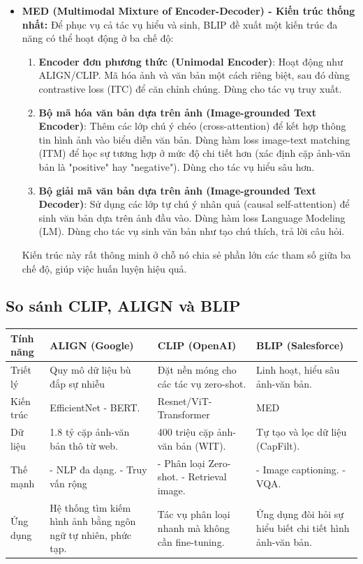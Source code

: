 \begin{itemize}
    \item \textbf{MED (Multimodal Mixture of Encoder-Decoder) - Kiến trúc thống nhất:} Để phục vụ cả tác vụ hiểu và sinh, BLIP đề xuất một kiến trúc đa năng có thể hoạt động ở ba chế độ:
    \begin{enumerate}
        \item \textbf{Encoder đơn phương thức (Unimodal Encoder)}: Hoạt động như ALIGN/CLIP. Mã hóa ảnh và văn bản một cách riêng biệt, sau đó dùng contrastive loss (ITC) để căn chỉnh chúng. Dùng cho tác vụ truy xuất.
        \item \textbf{Bộ mã hóa văn bản dựa trên ảnh (Image-grounded Text Encoder)}: Thêm các lớp chú ý chéo (cross-attention) để kết hợp thông tin hình ảnh vào biểu diễn văn bản. Dùng hàm loss image-text matching (ITM) để học sự tương hợp ở mức độ chi tiết hơn (xác định cặp ảnh-văn bản là "positive" hay "negative"). Dùng cho tác vụ hiểu sâu hơn.
        \item \textbf{Bộ giải mã văn bản dựa trên ảnh (Image-grounded Text Decoder)}: Sử dụng các lớp tự chú ý nhân quả (causal self-attention) để sinh văn bản dựa trên ảnh đầu vào. Dùng hàm loss Language Modeling (LM). Dùng cho tác vụ sinh văn bản như tạo chú thích, trả lời câu hỏi.
        
    \end{enumerate}

    Kiến trúc này rất thông minh ở chỗ nó chia sẻ phần lớn các tham số giữa ba chế độ, giúp việc huấn luyện hiệu quả.
\end{itemize}

\subsection{So sánh CLIP, ALIGN và BLIP}

\begin{table}[H]
{%
\begin{tabular}{|l|p{4.5cm}|p{4.5cm}|p{4.5cm}|}
\hline
\textbf{Tính năng} & \textbf{ALIGN (Google)} & \textbf{CLIP (OpenAI)} & \textbf{BLIP (Salesforce)} \\ \hline
Triết lý & Quy mô dữ liệu bù đắp sự nhiễu & Đặt nền móng cho các tác vụ zero-shot. & Linh hoạt, hiểu sâu ảnh-văn bản. \\ \hline
Kiến trúc & EfficientNet - BERT. & Resnet/ViT-Transformer & MED \\ \hline
Dữ liệu & 1.8 tỷ cặp ảnh-văn bản thô từ web. & 400 triệu cặp ảnh-văn bản (WIT). & Tự tạo và lọc dữ liệu (CapFilt). \\ \hline
Thế mạnh & - NLP đa dạng. \newline - Truy vấn rộng& - Phân loại Zero-shot. \newline - Retrieval image. & - Image captioning. \newline - VQA. \\ \hline
Ứng dụng & Hệ thống tìm kiếm hình ảnh bằng ngôn ngữ tự nhiên, phức tạp. & Tác vụ phân loại nhanh mà không cần fine-tuning. & Ứng dụng đòi hỏi sự hiểu biết chi tiết hình ảnh-văn bản. \\ \hline
\end{tabular}%
}
\end{table}


